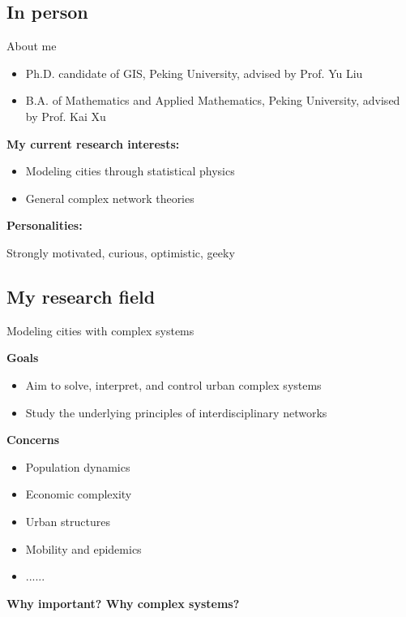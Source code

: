 \subsection{In person}
\begin{frame}{About me}
	
	\begin{itemize}
	    \item Ph.D. candidate of GIS, Peking University, advised by Prof. Yu Liu
	    \item B.A. of Mathematics and Applied Mathematics, Peking University, advised by Prof. Kai Xu
	\end{itemize}
\textbf{My current research interests:}
\begin{itemize}
    \item Modeling cities through statistical physics
    \item General complex network theories
\end{itemize}
\textbf{Personalities:} 

Strongly motivated, curious, optimistic, geeky
\end{frame}

\subsection{My research field}
\begin{frame}{Modeling cities with complex systems}

\textbf{Goals}

\begin{itemize}
  \item Aim to solve, interpret, and control urban complex systems
  \item Study the underlying principles of interdisciplinary networks
\end{itemize}

\textbf{Concerns}

\begin{itemize}
	\item Population dynamics
	\item Economic complexity
	\item Urban structures
	\item Mobility and epidemics
	\item ......
\end{itemize}
\textbf{Why important? Why complex systems?}
\end{frame}


